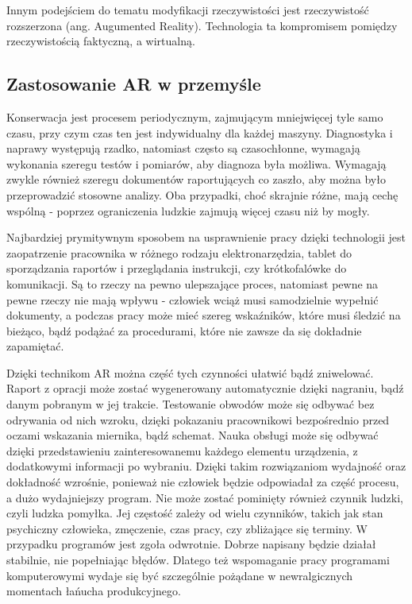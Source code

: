 \documentclass[12pt,twoside]{article}
\begin{document}
Innym podejściem do tematu modyfikacji rzeczywistości jest rzeczywistość rozszerzona (ang. Augumented Reality). Technologia ta kompromisem pomiędzy rzeczywistością faktyczną, a wirtualną.






\subsection {Zastosowanie AR w przemyśle}
Konserwacja jest procesem periodycznym, zajmującym mniejwięcej tyle samo czasu, przy czym czas ten jest indywidualny dla każdej maszyny. Diagnostyka i naprawy występują rzadko, natomiast często są czasochłonne, wymagają wykonania szeregu testów i pomiarów, aby diagnoza była możliwa. Wymagają zwykle również szeregu dokumentów raportujących co zaszło, aby można było przeprowadzić stosowne analizy. Oba przypadki, choć skrajnie różne, mają cechę wspólną - poprzez ograniczenia ludzkie zajmują więcej czasu niż by mogły.

Najbardziej prymitywnym sposobem na usprawnienie pracy dzięki technologii jest zaopatrzenie pracownika w różnego rodzaju elektronarzędzia, tablet do sporządzania raportów i przeglądania instrukcji, czy krótkofalówke do komunikacji. Są to rzeczy na pewno ulepszające proces, natomiast pewne na pewne rzeczy nie mają wpływu - człowiek wciąż musi samodzielnie wypełnić dokumenty, a podczas pracy może mieć szereg wskaźników, które musi śledzić na bieżąco, bądź podążać za procedurami, które nie zawsze da się dokładnie zapamiętać.

Dzięki technikom AR można część tych czynności ułatwić bądź zniwelować. Raport z opracji może zostać wygenerowany automatycznie dzięki nagraniu, bądź danym pobranym w jej trakcie. Testowanie obwodów może się odbywać bez odrywania od nich wzroku, dzięki pokazaniu pracownikowi bezpośrednio przed oczami wskazania miernika, bądź schemat. Nauka obsługi może się odbywać dzięki przedstawieniu zainteresowanemu każdego elementu urządzenia, z dodatkowymi informacji po wybraniu. Dzięki takim rozwiązaniom wydajność oraz dokładność wzrośnie, ponieważ nie człowiek będzie odpowiadał za część procesu, a dużo wydajniejszy program. Nie może zostać pominięty również czynnik ludzki, czyli ludzka pomyłka. Jej częstość zależy od wielu czynników, takich jak stan psychiczny człowieka, zmęczenie, czas pracy, czy zbliżające się terminy. W przypadku programów jest zgoła odwrotnie. Dobrze napisany będzie działał stabilnie, nie popełniając błędów. Dlatego też wspomaganie pracy programami komputerowymi wydaje się być szczególnie pożądane w newralgicznych momentach łańucha produkcyjnego.
\end{document}
